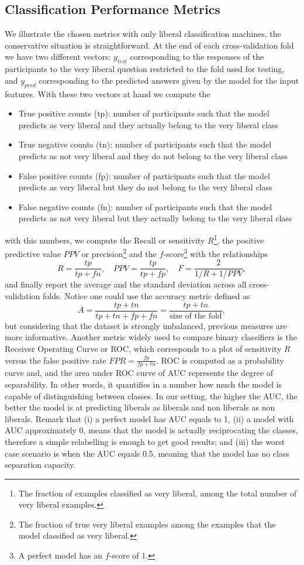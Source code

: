 \documentclass[onesided]{article}\usepackage[]{graphicx}\usepackage[]{color}
\begin{document}
\subsection{Classification Performance Metrics} We illustrate the chosen metrics with only liberal classification machines, the conservative situation is straightforward. At the end of each cross-validation fold we have two different vectors: $y_{test}$ corresponding to the responses of the participants to the very liberal question restricted to the fold used for testing, and $y_{pred}$ corresponding to the predicted answers given by the model for the input features. With these two vectors at hand we compute the 
\begin{itemize}
\item True positive counts (tp): number of participants such that the model predicts as very liberal and they actually belong to the very liberal class
\item True negative counts (tn): number of participants such that the model predicts as not very liberal and they do not belong to the very liberal class
\item False positive counts (fp): number of participants such that the model predicts as very liberal but they do not belong to the very liberal class
\item False negative counts (fn): number of participants such that the model predicts as not very liberal but they actually belong to the very liberal class
\end{itemize}
with this numbers, we compute the Recall or sensitivity $R$\footnote{The fraction of examples classified as very liberal, among the total number of very liberal examples.}, the positive predictive value $PPV$ or precision\footnote{The fraction of true very liberal examples among the examples that the model classified as very liberal.} and the $f$-score\footnote{A perfect model has an $f$-score of 1.} with the relationships
$$
R=\frac{tp}{tp+fn},\quad PPV=\frac{tp}{tp+fp},\quad F=\frac{2}{1/R+1/PPV},
$$
and finally report the average and the standard deviation across all cross-validation folds. Notice one could use the accuracy metric defined as
$$
A = \frac{tp+tn}{tp+tn+fp+fn}=\frac{tp+tn}{\text{size of the fold}},
$$
but considering that the dataset is strongly imbalanced, previous measures are more informative. Another metric widely used to compare binary classifiers \parencite{wolff2019machine,artetxe2020balanced} is the Receiver Operating Curve or ROC, which corresponds to a plot of sensitivity $R$ versus the false positive rate
$
FPR = \frac{fp}{fp+tn}.
$
ROC is computed as a probability curve and, and the area under ROC curve of AUC represents the degree of separability. In other words, it quantifies in a number how much the model is capable of distinguishing between classes. In our setting, the higher the AUC, the better the model is at predicting liberals as liberals and non liberals as non liberals. Remark that (i) a perfect model has AUC equals to 1, (ii) a model with AUC approximately 0, means that the model is actually reciprocating the classes, therefore a simple relabelling is enough to get good results; and (iii) the worst case scenario is when the AUC equals 0.5, meaning that the model has no class separation capacity.
\end{document}
